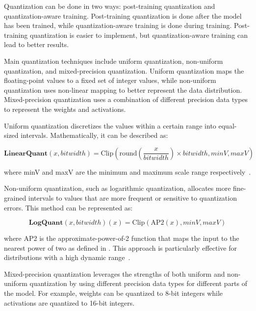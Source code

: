Quantization can be done in two ways: post-training quantization and quantization-aware training.
Post-training quantization is done after the model has been trained, while quantization-aware training is done during training.
Post-training quantization is easier to implement, but quantization-aware training can lead to better results.

Main quantization techniques include uniform quantization, non-uniform quantization, and mixed-precision quantization.
Uniform quantization maps the floating-point values to a fixed set of integer values, while non-uniform quantization uses non-linear mapping to better represent the data distribution.
Mixed-precision quantization uses a combination of different precision data types to represent the weights and activations.

Uniform quantization discretizes the values within a certain range into equal-sized intervals.
Mathematically, it can be described as:

\begin{equation}
	\textbf{LinearQuant}(x, bitwidth) = \text{Clip}(\text{round}(\frac{x}{bitwidth}) \times bitwidth, minV, maxV)
	\label{eq:uniform-quantization}
\end{equation}

\noindent where minV and maxV are the minimum and maximum scale range respectively~\cite{hubara2017quantized}.

Non-uniform quantization, such as logarithmic quantization, allocates more fine-grained intervals to values that are more frequent or sensitive to quantization errors.
This method can be represented as:

\begin{equation}
	\textbf{LogQuant}(x, bitwidth)(x) = \text{Clip}(\text{AP2}(x), minV, maxV)
	\label{eq:non-uniform-quantization}
\end{equation}

\noindent where AP2 is the approximate-power-of-2 function that maps the input to the nearest power of two as defined in \textcite{hubara2017quantized}.
This approach is particularly effective for distributions with a high dynamic range~\cite{miyashita2016convolutional}.

Mixed-precision quantization leverages the strengths of both uniform and non-uniform quantization by using different precision data types for different parts of the model.
For example, weights can be quantized to 8-bit integers while activations are quantized to 16-bit integers.

